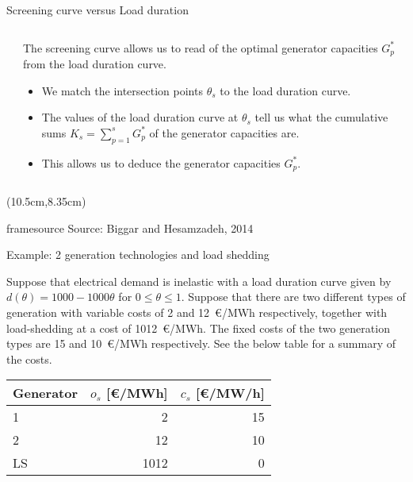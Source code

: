\documentclass[10pt,aspectratio=169,dvipsnames]{beamer}
\newcommand{\ra}[1]{\renewcommand{\arraystretch}{#1}}
\newcommand{\source}[1]{\begin{textblock*}{5cm}(10.5cm,8.35cm)
    \begin{beamercolorbox}[ht=0.5cm,right]{framesource}
        \usebeamerfont{framesource}\usebeamercolor[fg]{framesource} Source: {#1}
    \end{beamercolorbox}
\end{textblock*}}
\let\olditem\item
\renewcommand{\item}{%
\olditem\vspace{5pt}}
\begin{document}
\begin{frame}{Screening curve versus Load duration}

  \begin{columns}[T]
  \begin{column}{7cm}
  \centering
  \end{column}
  \begin{column}{6cm}

      The screening curve allows us to read of the optimal generator capacities $G_p^*$ from the load duration curve.

    \begin{itemize}

    \item We match the intersection points $\theta_s$ to the load duration curve.
    \item The values of the load duration curve at $\theta_s$ tell us what the cumulative sums $K_s = \sum_{p=1}^s G_p^*$  of the generator capacities are.
      \item This allows us to deduce the generator capacities $G_p^*$.
    \end{itemize}

  \end{column}
  \end{columns}
  \source{Biggar and Hesamzadeh, 2014}
\end{frame}


\begin{frame}{Example: 2 generation technologies and load shedding}


Suppose that electrical demand is inelastic with a  load duration curve given by $d(\theta)=1000-1000\theta$ for $0\leq \theta \leq 1$. Suppose that there are two different types of generation with variable costs of 2 and 12~\euro/MWh respectively, together with load-shedding at a cost of 1012~\euro/MWh. The fixed costs of the two generation types are 15 and 10~\euro/MWh respectively. See the below table for a summary of the costs.



  \ra{1.1}
  \begin{table}[!h]
    \begin{tabular}{lrr}
      \toprule
      Generator & $o_s$ [\euro/MWh] &  $c_s$ [\euro/MW/h] \\
      \midrule
      1 & 2 & 15 \\
      2 & 12 & 10 \\
      LS & 1012 & 0 \\
      \bottomrule
    \end{tabular}
  \end{table}


\end{frame}
\end{document}
